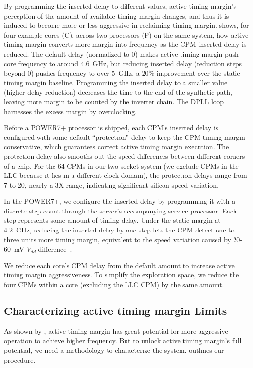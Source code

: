 By programming the inserted delay to different values, active timing margin's perception of the amount of available timing margin changes, and thus it is induced to become more or less aggressive in reclaiming timing margin.  shows, for four example cores (C), across two processors (P) on the same system, how active timing margin converts more margin into frequency as the CPM inserted delay is reduced. The default delay (normalized to 0) makes active timing margin push core frequency to around 4.6~GHz, but reducing inserted delay (reduction steps beyond 0) pushes frequency to over 5~GHz, a 20\% improvement over the static timing margin baseline. Programming the inserted delay to a smaller value (higher delay reduction) decreases the time to the end of the synthetic path, leaving more margin to be counted by the inverter chain. The DPLL loop harnesses the excess margin by overclocking.

Before a POWER7+ processor is shipped, each CPM's inserted delay is configured with some default ``protection'' delay to keep the CPM timing margin conservative, which guarantees correct active timing margin execution. The protection delay also smooths out the speed differences between different corners of a chip. For the 64 CPMs in our two-socket system (we exclude CPMs in the LLC because it lies in a different clock domain), the protection delays range from 7 to 20, nearly a 3X range, indicating significant silicon speed variation.

In the POWER7+, we configure the inserted delay by programming it with a discrete step count through the server's accompanying service processor. Each step represents some amount of timing delay. Under the static margin at 4.2~GHz, reducing the inserted delay by one step lets the CPM detect one to three units more timing margin, equivalent to the speed variation caused by 20-60~mV $V_{dd}$ difference~\cite{drake2013single,zu2015adaptive}.

We reduce each core's CPM delay from the default amount to increase active timing margin aggressiveness. To simplify the exploration space, we reduce the four CPMs within a core (excluding the LLC CPM) by the same amount.

\subsection{Characterizing active timing margin Limits}
\label{sec:process:methodology}

As shown by , active timing margin has great potential for more aggressive operation to achieve higher frequency. But to unlock active timing margin's full potential, we need a methodology to characterize the system.  outlines our procedure. 

